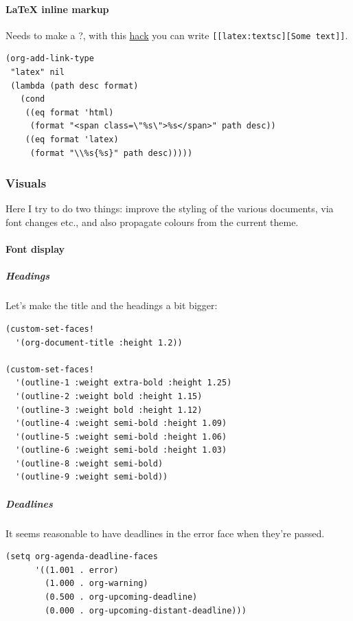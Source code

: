 \documentclass[11pt]{article}
\begin{document}
\paragraph{\LaTeX{} inline markup}
\label{sec:org2997636}
Needs to make a ?, with this \href{https://orgmode.org/worg/org-tutorials/org-latex-export.html}{hack} you can write
\texttt{[[latex:textsc][Some text]]}.

\begin{verbatim}
(org-add-link-type
 "latex" nil
 (lambda (path desc format)
   (cond
    ((eq format 'html)
     (format "<span class=\"%s\">%s</span>" path desc))
    ((eq format 'latex)
     (format "\\%s{%s}" path desc)))))
\end{verbatim}

\subsubsection{Visuals}
\label{sec:orgfb71cac}
Here I try to do two things: improve the styling of the various documents, via
font changes etc., and also propagate colours from the current theme.

\paragraph{Font display}
\label{sec:org555af77}
\subparagraph{Headings}
\label{sec:orgb5d650c}
Let's make the title and the headings a bit bigger:

\begin{verbatim}
(custom-set-faces!
  '(org-document-title :height 1.2))

(custom-set-faces!
  '(outline-1 :weight extra-bold :height 1.25)
  '(outline-2 :weight bold :height 1.15)
  '(outline-3 :weight bold :height 1.12)
  '(outline-4 :weight semi-bold :height 1.09)
  '(outline-5 :weight semi-bold :height 1.06)
  '(outline-6 :weight semi-bold :height 1.03)
  '(outline-8 :weight semi-bold)
  '(outline-9 :weight semi-bold))
\end{verbatim}

\subparagraph{Deadlines}
\label{sec:orgf852ef0}
It seems reasonable to have deadlines in the error face when they're passed.

\begin{verbatim}
(setq org-agenda-deadline-faces
      '((1.001 . error)
        (1.000 . org-warning)
        (0.500 . org-upcoming-deadline)
        (0.000 . org-upcoming-distant-deadline)))
\end{verbatim}
\end{document}
